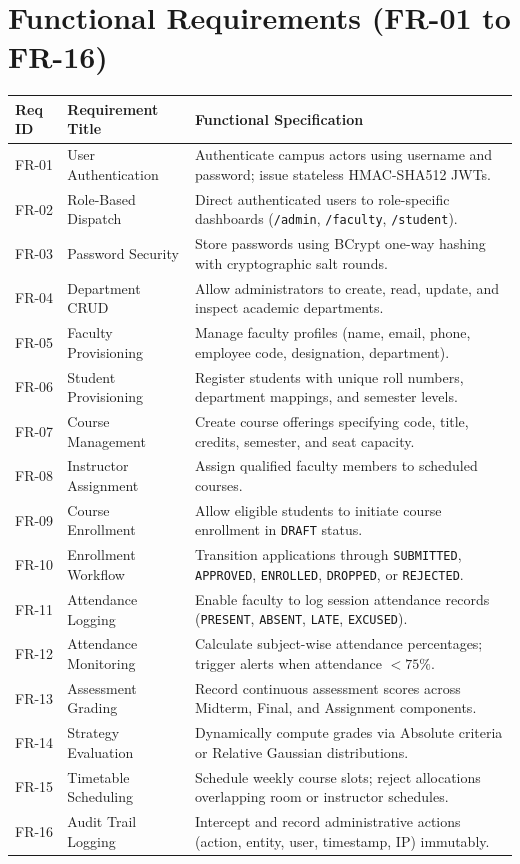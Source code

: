\documentclass[12pt,a4paper,oneside]{report}
\begin{document}
\section{Functional Requirements (FR-01 to FR-16)}
\begin{longtable}{p{}p{}p{}}
\toprule
\textbf{Req ID} & \textbf{Requirement Title} & \textbf{Functional Specification} \\
\midrule
\endhead
FR-01 & User Authentication & Authenticate campus actors using username and password; issue stateless HMAC-SHA512 JWTs. \\
FR-02 & Role-Based Dispatch & Direct authenticated users to role-specific dashboards (\texttt{/admin}, \texttt{/faculty}, \texttt{/student}). \\
FR-03 & Password Security & Store passwords using BCrypt one-way hashing with cryptographic salt rounds. \\
FR-04 & Department CRUD & Allow administrators to create, read, update, and inspect academic departments. \\
FR-05 & Faculty Provisioning & Manage faculty profiles (name, email, phone, employee code, designation, department). \\
FR-06 & Student Provisioning & Register students with unique roll numbers, department mappings, and semester levels. \\
FR-07 & Course Management & Create course offerings specifying code, title, credits, semester, and seat capacity. \\
FR-08 & Instructor Assignment & Assign qualified faculty members to scheduled courses. \\
FR-09 & Course Enrollment & Allow eligible students to initiate course enrollment in \texttt{DRAFT} status. \\
FR-10 & Enrollment Workflow & Transition applications through \texttt{SUBMITTED}, \texttt{APPROVED}, \texttt{ENROLLED}, \texttt{DROPPED}, or \texttt{REJECTED}. \\
FR-11 & Attendance Logging & Enable faculty to log session attendance records (\texttt{PRESENT}, \texttt{ABSENT}, \texttt{LATE}, \texttt{EXCUSED}). \\
FR-12 & Attendance Monitoring & Calculate subject-wise attendance percentages; trigger alerts when attendance $< 75\%$. \\
FR-13 & Assessment Grading & Record continuous assessment scores across Midterm, Final, and Assignment components. \\
FR-14 & Strategy Evaluation & Dynamically compute grades via Absolute criteria or Relative Gaussian distributions. \\
FR-15 & Timetable Scheduling & Schedule weekly course slots; reject allocations overlapping room or instructor schedules. \\
FR-16 & Audit Trail Logging & Intercept and record administrative actions (action, entity, user, timestamp, IP) immutably. \\
\bottomrule
\end{longtable}
\end{document}
